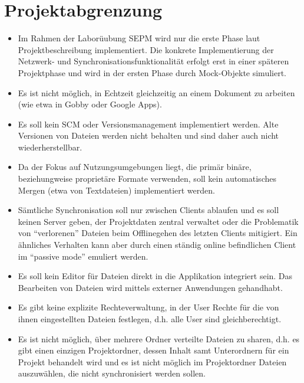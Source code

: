 
\section{Projektabgrenzung}
\begin{itemize}
  \item Im Rahmen der Laborüubung SEPM wird nur die erste Phase laut Projektbeschreibung implementiert. Die konkrete Implementierung der Netzwerk- und Synchronisationsfunktionalität erfolgt erst in einer späteren Projektphase und wird in der ersten Phase durch Mock-Objekte simuliert.
  \item Es ist nicht möglich, in Echtzeit gleichzeitig an einem Dokument zu arbeiten (wie etwa in Gobby oder Google Apps).
  \item Es soll kein SCM oder Versionsmanagement implementiert werden. Alte Versionen von Dateien werden nicht behalten und sind daher auch nicht wiederherstellbar.
  \item Da der Fokus auf Nutzungsumgebungen liegt, die primär binäre, beziehungweise proprietäre Formate verwenden, soll kein automatisches Mergen (etwa von Textdateien) implementiert werden.
  \item Sämtliche Synchronisation soll nur zwischen Clients ablaufen und es soll keinen Server geben, der Projektdaten zentral verwaltet oder die Problematik von ``verlorenen'' Dateien beim Offlinegehen des letzten Clients mitigiert. Ein ähnliches Verhalten kann aber durch einen ständig online befindlichen Client im ``passive mode'' emuliert werden.
  \item Es soll kein Editor für Dateien direkt in die Applikation integriert sein. Das Bearbeiten von Dateien wird mittels externer Anwendungen gehandhabt.
  \item Es gibt keine explizite Rechteverwaltung, in der User Rechte für die von ihnen eingestellten Dateien festlegen, d.h. alle User sind gleichberechtigt.
  \item Es ist nicht möglich, über mehrere Ordner verteilte Dateien zu sharen, d.h. es gibt einen einzigen Projektordner, dessen Inhalt samt Unterordnern für ein Projekt behandelt wird und es ist nicht möglich im Projektordner Dateien auszuwählen, die nicht synchronisiert werden sollen.
\end{itemize}
